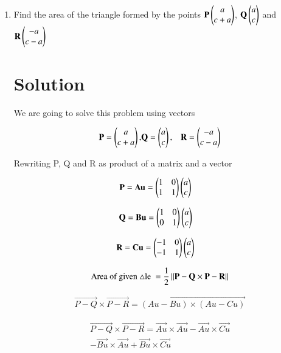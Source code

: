\documentclass[journal,12pt,twocolumn]{IEEEtran}
\renewcommand\thesection{\arabic{section}}
\begin{document}
\begin{enumerate}[label=\thesection.\arabic*.,ref=\thesection.\theenumi]

\item Find the area of the triangle formed by the points $ \mathbf{P} \begin{pmatrix}a\\c+a\end{pmatrix}$, $\mathbf{Q} \begin{pmatrix}a\\c\end{pmatrix}$ and $\mathbf{R} \begin{pmatrix}-a\\c-a\end{pmatrix}$

\section{Solution}
We are going to solve this problem using vectors

\begin{align}
\mathbf{P}=\begin{pmatrix}a\\c+a\end{pmatrix},&\mathbf{Q} =\begin{pmatrix}a\\c\end{pmatrix},&\mathbf{R} =\begin{pmatrix}-a\\c-a\end{pmatrix}
\label{3}
\end{align}

Rewriting P, Q and R as product of a matrix and a vector

\begin{align}
\mathbf{P}=\mathbf{Au}=\begin{pmatrix}1&0\\1&1\end{pmatrix}\begin{pmatrix}a\\c\end{pmatrix}&&
\end{align}

\begin{align}
\mathbf{Q}=\mathbf{Bu}=\begin{pmatrix}1&0\\0&1\end{pmatrix}&\begin{pmatrix}a\\c\end{pmatrix}&
\end{align}

\begin{align}
\mathbf{R}=\mathbf{Cu}=\begin{pmatrix}-1&0\\-1&1\end{pmatrix}&\begin{pmatrix}a\\c\end{pmatrix}&
\end{align}

\begin{multline}
\text{Area of given $\triangle$le }=\frac{1}{2}\norm{\Vec{P-Q}\times\Vec{P-R}}
\label{1}
\end{multline}

\begin{multline}
\Vec{P-Q}\times  \Vec{P-R} = \vec{(Au-Bu)\times(Au-Cu)}
\end{multline}

\begin{multline}
\Vec{P-Q}\times  \Vec{P-R}=\vec{Au}\times\vec{Au}-\vec{Au}\times\vec{Cu}\\
-\vec{Bu}\times\vec{Au}+\vec{Bu}\times\vec{Cu}
\end{multline}


\end{enumerate}
\end{document}
